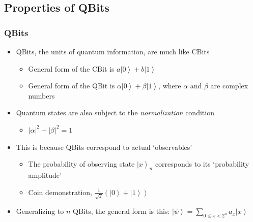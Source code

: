 \documentclass{beamer}
\newcommand{\ket}[1]{\left|{#1}\right\rangle}
\newcommand{\zvec}{\ket{0}}
\newcommand{\ovec}{\ket{1}}
\begin{document}
  \subsection{Properties of QBits}
  \begin{frame}
    \frametitle{QBits}
    \begin{itemize}
      \item{QBits, the units of quantum information, are much like CBits}
      \begin{itemize}
        \item{General form of the CBit is $a\zvec + b\ovec$}
        \item{General form of the QBit is $\alpha\zvec + \beta\ovec$}, where $\alpha$
          and $\beta$ are complex numbers
      \end{itemize}
    \item{Quantum states are also subject to the \textit{normalization} condition}
      \begin{itemize}
        \item{$|\alpha|^{2} + |\beta|^{2} = 1$}
      \end{itemize}
      \item{This is because QBits correspond to actual `observables'}
      \begin{itemize}
        \item{The probability of observing state $\ket{x}_{n}$ corresponds to its `probability amplitude'}
        \item{Coin demonstration, $\frac{1}{\sqrt{2}}(\zvec + \ovec)$}
      \end{itemize}
      \item{Generalizing to $n$ QBits, the general form is this:} \linebreak
        $\ket{\psi} =  \sum\limits_{0 \leq x < 2^{n}}a_{x}\ket{x}$
    \end{itemize}
  \end{frame}
\end{document}
